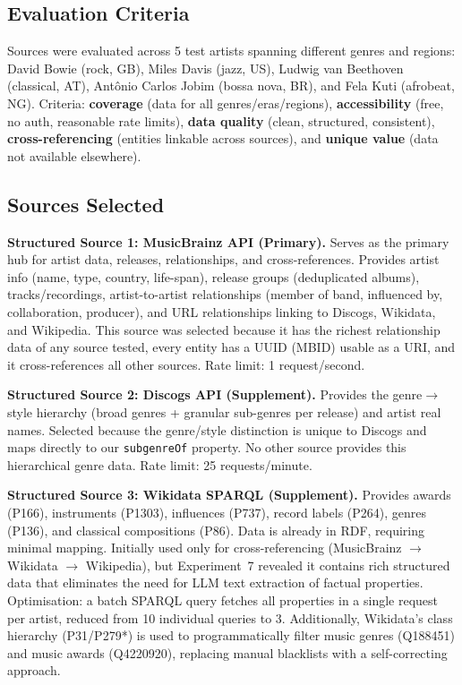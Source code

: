 \documentclass[11pt,a4paper]{article}
\begin{document}
\subsection{Evaluation Criteria}

Sources were evaluated across 5 test artists spanning different genres and regions: David Bowie (rock, GB), Miles Davis (jazz, US), Ludwig van Beethoven (classical, AT), Ant\^{o}nio Carlos Jobim (bossa nova, BR), and Fela Kuti (afrobeat, NG). Criteria: \textbf{coverage} (data for all genres/eras/regions), \textbf{accessibility} (free, no auth, reasonable rate limits), \textbf{data quality} (clean, structured, consistent), \textbf{cross-referencing} (entities linkable across sources), and \textbf{unique value} (data not available elsewhere).

\subsection{Sources Selected}

\textbf{Structured Source 1: MusicBrainz API (Primary).} Serves as the primary hub for artist data, releases, relationships, and cross-references. Provides artist info (name, type, country, life-span), release groups (deduplicated albums), tracks/recordings, artist-to-artist relationships (member of band, influenced by, collaboration, producer), and URL relationships linking to Discogs, Wikidata, and Wikipedia. This source was selected because it has the richest relationship data of any source tested, every entity has a UUID (MBID) usable as a URI, and it cross-references all other sources. Rate limit: 1 request/second.

\textbf{Structured Source 2: Discogs API (Supplement).} Provides the genre$\rightarrow$style hierarchy (broad genres + granular sub-genres per release) and artist real names. Selected because the genre/style distinction is unique to Discogs and maps directly to our \texttt{subgenreOf} property. No other source provides this hierarchical genre data. Rate limit: 25 requests/minute.

\textbf{Structured Source 3: Wikidata SPARQL (Supplement).} Provides awards (P166), instruments (P1303), influences (P737), record labels (P264), genres (P136), and classical compositions (P86). Data is already in RDF, requiring minimal mapping. Initially used only for cross-referencing (MusicBrainz $\rightarrow$ Wikidata $\rightarrow$ Wikipedia), but Experiment~7 revealed it contains rich structured data that eliminates the need for LLM text extraction of factual properties. Optimisation: a batch SPARQL query fetches all properties in a single request per artist, reduced from 10 individual queries to 3. Additionally, Wikidata's class hierarchy (P31/P279*) is used to programmatically filter music genres (Q188451) and music awards (Q4220920), replacing manual blacklists with a self-correcting approach.
\end{document}
